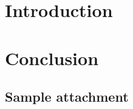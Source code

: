\documentclass[ieee]{tauthesis}
\begin{document}
\clearpage
{}
\setcounter{page}{0}


\maketitle


\ifdraftmode\else

    \tableofcontents

    \glsaddall
    \setlength{\glsnamewidth}{0.25\textwidth}
    \setlength{\glsdescwidth}{0.75\textwidth}
    \renewcommand*{\glsgroupskip}{}

    \printglossary[title={Glossary}]
\fi



\clearpage
{}
\setcounter{page}{1}


\chapter{Introduction}
\label{ch:introduction}



\chapter{Conclusion}
\label{ch:conclusion}



\ifdraftmode\else
    \printbibliography[heading=bibintoc]
\fi


\begin{appendices}

    \chapter{Sample attachment}
    \label{ch:appendix}
    

\end{appendices}
\end{document}
